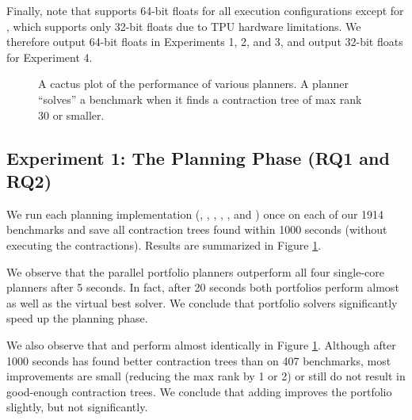 Finally, note that  supports 64-bit floats for all execution configurations except for , which supports only 32-bit floats due to TPU hardware limitations. We therefore output 64-bit floats in Experiments 1, 2, and 3, and output 32-bit floats for Experiment 4.

\begin{figure}
	\centering
	
    \vspace*{-0.9cm}
	\caption{\label{fig:parallel:planning} A cactus plot of the performance of various planners. A planner ``solves'' a benchmark when it finds a contraction tree of max rank 30 or smaller.}
\end{figure}

\subsection{Experiment 1: The Planning Phase (RQ1 and RQ2)}
We run each planning implementation (, , , , , and ) once on each of our 1914 benchmarks and save all contraction trees found within 1000 seconds (without executing the contractions). Results are summarized in Figure \ref{fig:parallel:planning}. 


%


We observe that the parallel portfolio planners outperform all four single-core planners after 5 seconds. In fact, after 20 seconds both portfolios perform almost as well as the virtual best solver. We conclude that portfolio solvers significantly speed up the planning phase.

We also observe that  and  perform almost identically in Figure \ref{fig:parallel:planning}. Although after 1000 seconds  has found better contraction trees than  on 407 benchmarks, most improvements are small (reducing the max rank by 1 or 2) or still do not result in good-enough contraction trees. We conclude that adding  improves the portfolio slightly, but not significantly.
 
